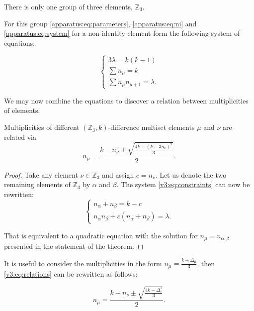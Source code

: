 There is only one group of three elements, $\mathbb Z_3$.

For this group \eqref{apparatus:eq:parameters}, \eqref{apparatus:eq:ni} and \eqref{apparatus:eq:system} for a non-identity element form the following system of equations:

\begin{equation}
	\label{v3:eq:constraints}
	\begin{cases}
		3\lambda = k(k-1) \\
		\sum n_\mu = k \\
		\sum n_\mu n_{\mu+1} = \lambda.
	\end{cases}
\end{equation}

We may now combine the equations to discover a relation between multiplicities of elements.

\begin{theorem}
	\label{v3:theorem:relations}
	Multiplicities of different $(\mathbb Z_3,k)$-difference multiset elements $\mu$ and $\nu$ are related via
	\begin{equation}
		\label{v3:eq:relations}
		n_{\mu} = \frac{k-n_\nu \pm \sqrt{\frac{4k-(k-3n_\nu)^2}{3}}}{2}.
	\end{equation}
\end{theorem}

\begin{proof}
	Take any element $\nu \in \mathbb Z_3$ and assign $c = n_\nu$. Let us denote the two remaining elements of $\mathbb Z_3$ by $\alpha$ and $\beta$. The system \eqref{v3:eq:constraints} can now be rewritten:
	\begin{equation}
		\begin{cases}
			n_\alpha + n_\beta = k - c \\
			n_\alpha n_\beta + c (n_\alpha + n_\beta)  = \lambda.
		\end{cases}
	\end{equation}

That is equivalent to a quadratic equation with the solution for $n_{\mu}=n_{\alpha,\beta}$ presented in the statement of the theorem.
\end{proof}

It is useful to consider the multiplicities in the form $n_\mu = \frac{k+\Delta_\mu}{3}$, then \eqref{v3:eq:relations} can be rewritten as follows:

\begin{equation}
	\label{v3:eq:relations_delta}
	n_{\mu} = \frac{k-n_\nu \pm \sqrt{\frac{4k-\Delta_\nu^2}{3}}}{2}.
\end{equation}

